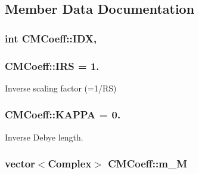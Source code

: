 \subsection{Member Data Documentation}
\hypertarget{classCMCoeff_ab1882e6a0df777b1acffadf55844dc92}{
\subsubsection[{I\-D\-X}]{\setlength{\rightskip}{0pt plus 5cm}int C\-M\-Coeff\-::\-I\-D\-X\hspace{0.3cm}{\ttfamily [static]}, {\ttfamily [protected]}}}\label{classCMCoeff_ab1882e6a0df777b1acffadf55844dc92}
\hypertarget{classCMCoeff_a7e893ff6deb29f85472663fffd995f42}{
\subsubsection[{I\-R\-S}]{ C\-M\-Coeff\-::\-I\-R\-S = 1.\hspace{0.3cm}{\ttfamily [static]}}}\label{classCMCoeff_a7e893ff6deb29f85472663fffd995f42}


Inverse scaling factor (=1/\-R\-S) 

\hypertarget{classCMCoeff_a468f6af1ba4ddbe13561217488c87b40}{
\subsubsection[{K\-A\-P\-P\-A}]{ C\-M\-Coeff\-::\-K\-A\-P\-P\-A = 0.\hspace{0.3cm}{\ttfamily [static]}}}\label{classCMCoeff_a468f6af1ba4ddbe13561217488c87b40}


Inverse Debye length. 

\hypertarget{classCMCoeff_a15347641cc66b95ff56bea89f4585edf}{
\subsubsection[{m\-\_\-\-M}]{\setlength{\rightskip}{0pt plus 5cm}vector$<${\bf Complex}$>$ C\-M\-Coeff\-::m\-\_\-\-M\hspace{0.3cm}{\ttfamily [protected]}}}\label{classCMCoeff_a15347641cc66b95ff56bea89f4585edf}



